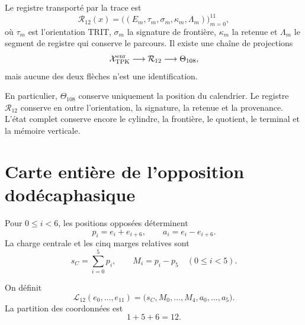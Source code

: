 \begin{definition}
\label{def:registro-enriquecido-dodecafasico}
Le registre transporté par la trace est
\[
 \mathcal R_{12}(x)=
 \bigl((E_m,\tau_m,\sigma_m,\kappa_m,\Lambda_m)\bigr)_{m=0}^{11},
\]
où \(\tau_m\) est l'orientation TRIT, \(\sigma_m\) la signature de frontière, \(\kappa_m\) la retenue et \(\Lambda_m\) le segment de registre qui conserve le parcours. Il existe une chaîne de projections
\[
 \mathcal X_{\rm TPK}^{\rm enr}
 \longrightarrow\mathcal R_{12}
 \longrightarrow\Theta_{108},
\]
mais aucune des deux flèches n’est une identification.
\end{definition}

En particulier, \(\Theta_{108}\) conserve uniquement la position du calendrier.
Le registre \(\mathcal R_{12}\) conserve en outre l’orientation, la signature,
la retenue et la provenance. L’état complet conserve encore le cylindre,
la frontière, le quotient, le terminal et la mémoire verticale.

\section{Carte entière de l’opposition dodécaphasique}

Pour \(0\leq i<6\), les positions opposées déterminent
\begin{equation}
 p_i=e_i+e_{i+6},
 \qquad
 a_i=e_i-e_{i+6}.
 \label{eq:pares-opuestos-registro}
\end{equation}
La charge centrale et les cinq marges relatives sont
\begin{equation}
 s_C=\sum_{i=0}^{5}p_i,
 \qquad
 M_i=p_i-p_5\quad(0\leq i<5).
 \label{eq:carga-margenes-registro}
\end{equation}

\begin{definition}
\label{def:carta-integral-156}
On définit
\begin{equation}
 \mathcal L_{12}(e_0,\ldots,e_{11})
 =\bigl(s_C,M_0,\ldots,M_4,a_0,\ldots,a_5\bigr).
 \label{eq:carta-integral-156}
\end{equation}
La partition des coordonnées est
\[
 1+5+6=12.
\]
\end{definition}

